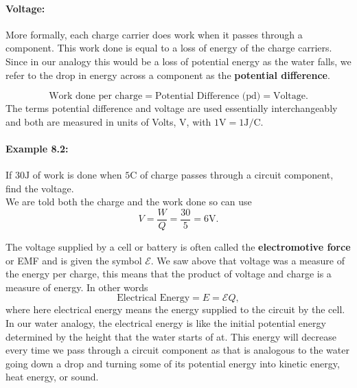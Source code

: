 \paragraph{Voltage:} More formally, each charge carrier does work when it passes through a component. This work done is equal to a loss of energy of the charge carriers. Since in our analogy this would be a loss of potential energy as the water falls, we refer to the drop in energy across a component as the \textbf{potential difference}.

\begin{equation*}
\text{Work done per charge} = \text{Potential Difference (pd)} = \text{Voltage}.
\end{equation*}
The terms potential difference and voltage are used essentially interchangeably  and both are measured in units of Volts, $\text{V}$, with $1\text{V}=1\text{J/C}$. 

\paragraph{Example 8.2:} If $30\text{J}$ of work is done when $5\text{C}$ of charge passes through a circuit component, find the voltage.\\

We are told both the charge and the work done so can use
\begin{equation*}
V=\frac{W}{Q}=\frac{30}{5}=6\text{V}.
\end{equation*}

The voltage supplied by a cell or battery is often called the \textbf{electromotive force} or EMF and is given the symbol $\mathcal{E}$. We saw above that voltage was a measure of the energy per charge, this means that the product of voltage and charge is a measure of energy. In other words
\begin{equation}
\text{Electrical Energy}=E=\mathcal{E}Q,
\end{equation}
where here electrical energy means the energy supplied to the circuit by the cell.\\

In our water analogy, the electrical energy is like the initial potential energy determined by the height that the water starts of at. This energy will decrease every time we pass through a circuit component as that is analogous to the water going down a drop and turning some of its potential energy into kinetic energy, heat energy, or sound.\\

